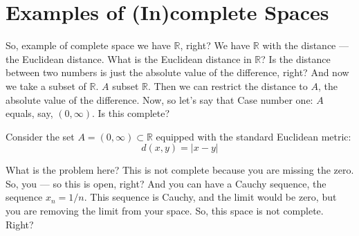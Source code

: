 \section{Examples of (In)complete Spaces}

\begin{spoken-clean}[00:04:05 - 00:05:24]
So, example of complete space we have $\mathbb{R}$, right? We have $\mathbb{R}$ with the distance --- the Euclidean distance.  What is the Euclidean distance in $\mathbb{R}$? Is the distance between two numbers is just the absolute value of the difference, right? And now we take a subset of $\mathbb{R}$. $A$ subset $\mathbb{R}$. Then we can restrict the distance to $A$, the absolute value of the difference. Now, so let's say that Case number one: $A$ equals, say, $(0, \infty)$. Is this complete?
\end{spoken-clean}

\begin{math-stroke}
Consider the set $A = (0, \infty) \subset \mathbb{R}$ equipped with the standard Euclidean metric:
\[ d(x, y) = |x - y| \]
\begin{center}
\end{center}
\end{math-stroke}

\begin{spoken-clean}[00:05:24 - 00:06:15]
What is the problem here? This is not complete because you are missing the zero. So, you --- so this is open, right? And you can have a Cauchy sequence, the sequence $x_n = 1/n$.  This sequence is Cauchy, and the limit would be zero, but you are removing the limit from your space. So, this space is not complete. Right?
\end{spoken-clean}

